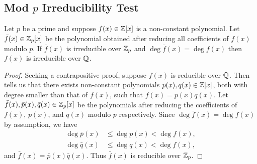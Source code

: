 \subsection{Mod $p$ Irreducibility Test}
\begin{theorem}\label{thrm-mod-p-irreducibility-test}
    Let $p$ be a prime and suppose $f(x) \in \mathbb{Z}[x]$ is a non-constant polynomial. Let $\bar{f}(x) \in \mathbb{Z}_p[x]$ be the polynomial obtained after reducing all coefficients of $f(x)$ modulo $p$. If $\bar{f}(x)$ is irreducible over $\mathbb{Z}_p$ and $\deg \bar{f}(x) = \deg f(x)$ then $f(x)$ is irreducible over $\mathbb{Q}$.
\end{theorem}
\begin{proof}
    Seeking a contrapositive proof, suppose $f(x)$ is reducible over $\mathbb{Q}$. Then  tells us that there exists non-constant polynomials $p(x), q(x) \in \mathbb{Z}[x]$, both with degree smaller than that of $f(x)$, such that $f(x) = p(x)q(x)$. Let $\bar{f}(x), \bar{p}(x), \bar{q}(x) \in \mathbb{Z}_p[x]$ be the polynomials after reducing the coefficients of $f(x)$, $p(x)$, and $q(x)$ modulo $p$ respectively. Since $\deg \bar{f}(x) = \deg f(x)$ by assumption, we have
    \begin{align*}
        \deg \bar{p}(x) &\leq \deg p(x) < \deg f(x),\\
        \deg \bar{q}(x) &\leq \deg q(x) < \deg f(x),
    \end{align*}
    and $\bar{f}(x) = \bar{p}(x)\bar{q}(x)$. Thus $\bar{f}(x)$ is reducible over $\mathbb{Z}_p$.
\end{proof}


